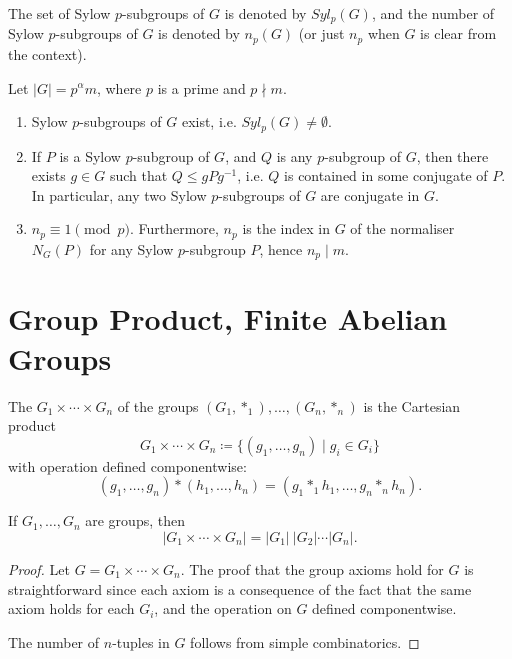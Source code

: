 \begin{notation}
The set of Sylow $p$-subgroups of $G$ is denoted by $Syl_p(G)$, and the number of Sylow $p$-subgroups of $G$ is denoted by $n_p(G)$ (or just $n_p$ when $G$ is clear from the context).
\end{notation}

\begin{theorem}
Let $|G|=p^\alpha m$, where $p$ is a prime and $p\nmid m$.
\begin{enumerate}[label=(\roman*)]
\item Sylow $p$-subgroups of $G$ exist, i.e. $Syl_p(G)\neq\emptyset$.
\item If $P$ is a Sylow $p$-subgroup of $G$, and $Q$ is any $p$-subgroup of $G$, then there exists $g\in G$ such that $Q\le gPg^{-1}$, i.e. $Q$ is contained in some conjugate of $P$. In particular, any two Sylow $p$-subgroups of $G$ are conjugate in $G$.
\item $n_p\equiv1\pmod p$. Furthermore, $n_p$ is the index in $G$ of the normaliser $N_G(P)$ for any Sylow $p$-subgroup $P$, hence $n_p\mid m$.
\end{enumerate}
\end{theorem}
\pagebreak

\section{Group Product, Finite Abelian Groups}
\begin{definition}
The  $G_1\times\cdots\times G_n$ of the groups $(G_1,\ast_1),\dots,(G_n,\ast_n)$ is the Cartesian product
\[G_1\times\cdots\times G_n\coloneqq\{(g_1,\dots,g_n)\mid g_i\in G_i\}\]
with operation defined componentwise:
\[(g_1,\dots,g_n)\ast(h_1,\dots,h_n)=(g_1\ast_1 h_1,\dots,g_n\ast_n h_n).\]
\end{definition}

\begin{proposition}
If $G_1,\dots,G_n$ are groups, then
\[|G_1\times\cdots\times G_n|=|G_1|\:|G_2|\cdots|G_n|.\]
\end{proposition}

\begin{proof}
Let $G=G_1\times\cdots\times G_n$. The proof that the group axioms hold for $G$ is straightforward since each axiom is a consequence of the fact that the same axiom holds for each $G_i$, and the operation on $G$ defined componentwise.

The number of $n$-tuples in $G$ follows from simple combinatorics.
\end{proof}
\pagebreak

